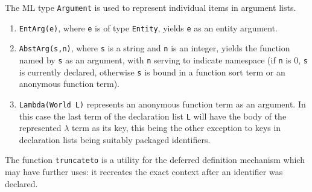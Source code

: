 \documentclass{article}
\begin{document}
The ML type {\tt Argument} is used to represent individual items in argument lists.

\begin{enumerate}

\item {\tt EntArg(e)}, where {\tt e} is of type {\tt Entity}, yields {\tt e} as an entity argument.

\item {\tt AbstArg(s,n)}, where {\tt s} is a string and {\tt n} is an integer, yields the function named by {\tt s} as an argument,
with {\tt n} serving to indicate namespace (if {\tt n} is 0, {\tt s} is currently declared, otherwise {\tt s} is bound in a function sort term or an anonymous function term).

\item {\tt Lambda(World L)} represents an anonymous function term as an argument.  In this case the last term of the declaration list {\tt L} will
have the body of the represented $\lambda$ term as its key, this being the other exception to keys in declaration lists being suitably packaged identifiers.

\end{enumerate}

The function {\tt truncateto} is a utility for the deferred definition mechanism which may have further uses:
it recreates the exact context after an identifier was declared.
\end{document}
